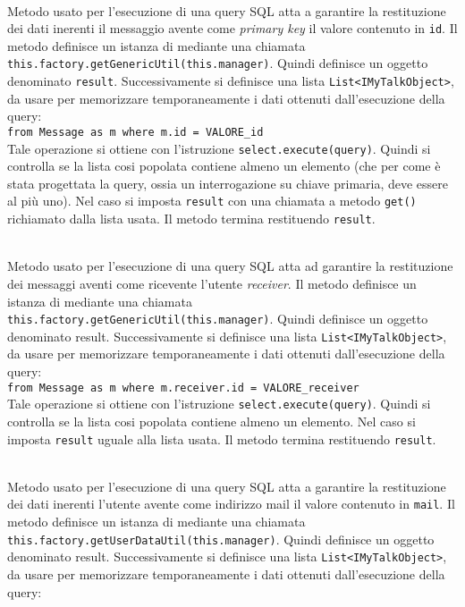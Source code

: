 \begin{description}
	\item{}\\
	Metodo usato per l'esecuzione di una query SQL atta a garantire la restituzione dei dati inerenti il messaggio avente come \textit{primary key} il valore contenuto in \texttt{id}. Il metodo definisce un istanza di  mediante una chiamata \verb|this.factory.getGenericUtil(this.manager)|. Quindi definisce un oggetto  denominato \texttt{result}. Successivamente si definisce una lista \texttt{List<IMyTalkObject>}, da usare per memorizzare temporaneamente i dati ottenuti dall'esecuzione della query:\\
	
	\verb|from Message as m where m.id = VALORE_id|\\
	
	Tale operazione si ottiene con l'istruzione \verb|select.execute(query)|. Quindi si controlla se la lista cosi popolata contiene almeno un elemento (che per come è stata progettata la query, ossia un interrogazione su chiave primaria, deve essere al più uno). Nel caso si imposta \texttt{result} con una chiamata a metodo \texttt{get()} richiamato dalla lista usata. Il metodo termina restituendo \texttt{result}.
	
		\item{}\\
	Metodo usato per l'esecuzione di una query SQL atta ad garantire la restituzione dei messaggi aventi come ricevente l'utente \textit{receiver}. Il metodo definisce un istanza di  mediante una chiamata \verb|this.factory.getGenericUtil(this.manager)|. Quindi definisce un oggetto  denominato result. Successivamente si definisce una lista \texttt{List<IMyTalkObject>}, da usare per memorizzare temporaneamente i dati ottenuti dall'esecuzione della query:\\
	
	\verb|from Message as m where m.receiver.id = VALORE_receiver|\\
	
	Tale operazione si ottiene con l'istruzione \verb|select.execute(query)|. Quindi si controlla se la lista cosi popolata contiene almeno un elemento. Nel caso si imposta \texttt{result} uguale alla lista usata. Il metodo termina restituendo \texttt{result}.	
	
	\item{}\\
	Metodo usato per l'esecuzione di una query SQL atta a garantire la restituzione dei dati inerenti l'utente avente come indirizzo mail il valore contenuto in \texttt{mail}. Il metodo definisce un istanza di  mediante una chiamata \verb|this.factory.getUserDataUtil(this.manager)|. Quindi definisce un oggetto  denominato result. Successivamente si definisce una lista \texttt{List<IMyTalkObject>}, da usare per memorizzare temporaneamente i dati ottenuti dall'esecuzione della query:\\
	

\end{description}
